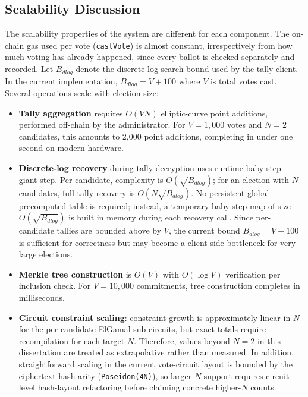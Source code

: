 \subsection{Scalability Discussion}

The scalability properties of the system are different for each component. The on-chain gas used per vote (\texttt{castVote}) is almost constant, irrespectively from how much voting has already happened, since every ballot is checked separately and recorded. Let $B_{dlog}$ denote the discrete-log search bound used by the tally client. In the current implementation, $B_{dlog}=V+100$ where $V$ is total votes cast. Several operations scale with election size:

\begin{itemize}
    \item \textbf{Tally aggregation} requires $O(VN)$ elliptic-curve point additions, performed off-chain by the administrator. For $V = 1{,}000$ votes and $N = 2$ candidates, this amounts to 2{,}000 point additions, completing in under one second on modern hardware.
    \item \textbf{Discrete-log recovery} during tally decryption uses runtime baby-step giant-step. Per candidate, complexity is $O(\sqrt{B_{dlog}})$; for an election with $N$ candidates, full tally recovery is $O(N\sqrt{B_{dlog}})$. No persistent global precomputed table is required; instead, a temporary baby-step map of size $O(\sqrt{B_{dlog}})$ is built in memory during each recovery call. Since per-candidate tallies are bounded above by $V$, the current bound $B_{dlog}=V+100$ is sufficient for correctness but may become a client-side bottleneck for very large elections.
    \item \textbf{Merkle tree construction} is $O(V)$ with $O(\log V)$ verification per inclusion check. For $V = 10{,}000$ commitments, tree construction completes in milliseconds.
    \item \textbf{Circuit constraint scaling}: constraint growth is approximately linear in $N$ for the per-candidate ElGamal sub-circuits, but exact totals require recompilation for each target $N$. Therefore, values beyond $N=2$ in this dissertation are treated as extrapolative rather than measured. In addition, straightforward scaling in the current vote-circuit layout is bounded by the ciphertext-hash arity (\texttt{Poseidon(4N)}), so larger-$N$ support requires circuit-level hash-layout refactoring before claiming concrete higher-$N$ counts.
\end{itemize}

